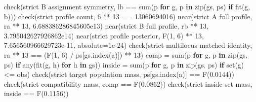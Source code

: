 \documentclass[
]{article}
\newenvironment{Shaded}{}{}
\newcommand{\BuiltInTok}[1]{\textcolor[rgb]{0.00,0.50,0.00}{#1}}
\newcommand{\ControlFlowTok}[1]{\textcolor[rgb]{0.00,0.44,0.13}{\textbf{#1}}}
\newcommand{\DecValTok}[1]{\textcolor[rgb]{0.25,0.63,0.44}{#1}}
\newcommand{\FloatTok}[1]{\textcolor[rgb]{0.25,0.63,0.44}{#1}}
\newcommand{\KeywordTok}[1]{\textcolor[rgb]{0.00,0.44,0.13}{\textbf{#1}}}
\newcommand{\NormalTok}[1]{#1}
\newcommand{\OperatorTok}[1]{\textcolor[rgb]{0.40,0.40,0.40}{#1}}
\newcommand{\StringTok}[1]{\textcolor[rgb]{0.25,0.44,0.63}{#1}}
\begin{document}
\begin{Shaded}
\begin{Highlighting}[]
\NormalTok{    check(}\StringTok{\textquotesingle{}strict B assignment symmetry\textquotesingle{}}\NormalTok{,}
\NormalTok{          lb }\OperatorTok{==} \BuiltInTok{sum}\NormalTok{(p }\ControlFlowTok{for}\NormalTok{ g, p }\KeywordTok{in} \BuiltInTok{zip}\NormalTok{(gs, ps) }\ControlFlowTok{if}\NormalTok{ fit(g, b)))}
\NormalTok{    check(}\StringTok{\textquotesingle{}strict profile count\textquotesingle{}}\NormalTok{, }\DecValTok{6} \OperatorTok{**} \DecValTok{13} \OperatorTok{==} \DecValTok{13060694016}\NormalTok{)}
\NormalTok{    near(}\StringTok{\textquotesingle{}strict A full profile\textquotesingle{}}\NormalTok{, ra }\OperatorTok{**} \DecValTok{13}\NormalTok{, }\FloatTok{6.688386286845605e13}\NormalTok{)}
\NormalTok{    near(}\StringTok{\textquotesingle{}strict B full profile\textquotesingle{}}\NormalTok{, rb }\OperatorTok{**} \DecValTok{13}\NormalTok{, }\FloatTok{3.795042627926862e14}\NormalTok{)}
\NormalTok{    near(}\StringTok{\textquotesingle{}strict profile posterior\textquotesingle{}}\NormalTok{, F(}\DecValTok{1}\NormalTok{, }\DecValTok{6}\NormalTok{) }\OperatorTok{**} \DecValTok{13}\NormalTok{, }\FloatTok{7.656560966629723e{-}11}\NormalTok{,}
\NormalTok{         absolute}\OperatorTok{=}\FloatTok{1e{-}24}\NormalTok{)}
\NormalTok{    check(}\StringTok{\textquotesingle{}strict multilocus matched identity\textquotesingle{}}\NormalTok{,}
\NormalTok{          ra }\OperatorTok{**} \DecValTok{13} \OperatorTok{==}\NormalTok{ (F(}\DecValTok{1}\NormalTok{, }\DecValTok{6}\NormalTok{) }\OperatorTok{/}\NormalTok{ ps[gs.index(a)]) }\OperatorTok{**} \DecValTok{13}\NormalTok{)}
\NormalTok{    comp }\OperatorTok{=} \BuiltInTok{sum}\NormalTok{(p }\ControlFlowTok{for}\NormalTok{ g, p }\KeywordTok{in} \BuiltInTok{zip}\NormalTok{(gs, ps) }\ControlFlowTok{if} \BuiltInTok{any}\NormalTok{(fit(g, h) }\ControlFlowTok{for}\NormalTok{ h }\KeywordTok{in}\NormalTok{ gs))}
\NormalTok{    inside }\OperatorTok{=} \BuiltInTok{sum}\NormalTok{(p }\ControlFlowTok{for}\NormalTok{ g, p }\KeywordTok{in} \BuiltInTok{zip}\NormalTok{(gs, ps) }\ControlFlowTok{if} \BuiltInTok{set}\NormalTok{(g) }\OperatorTok{\textless{}=}\NormalTok{ obs)}
\NormalTok{    check(}\StringTok{\textquotesingle{}strict target population mass\textquotesingle{}}\NormalTok{, ps[gs.index(a)] }\OperatorTok{==}\NormalTok{ F(}\StringTok{\textquotesingle{}0.0144\textquotesingle{}}\NormalTok{))}
\NormalTok{    check(}\StringTok{\textquotesingle{}strict compatibility mass\textquotesingle{}}\NormalTok{, comp }\OperatorTok{==}\NormalTok{ F(}\StringTok{\textquotesingle{}0.0862\textquotesingle{}}\NormalTok{))}
\NormalTok{    check(}\StringTok{\textquotesingle{}strict inside{-}set mass\textquotesingle{}}\NormalTok{, inside }\OperatorTok{==}\NormalTok{ F(}\StringTok{\textquotesingle{}0.1156\textquotesingle{}}\NormalTok{))}

\end{Highlighting}
\end{Shaded}
\end{document}
